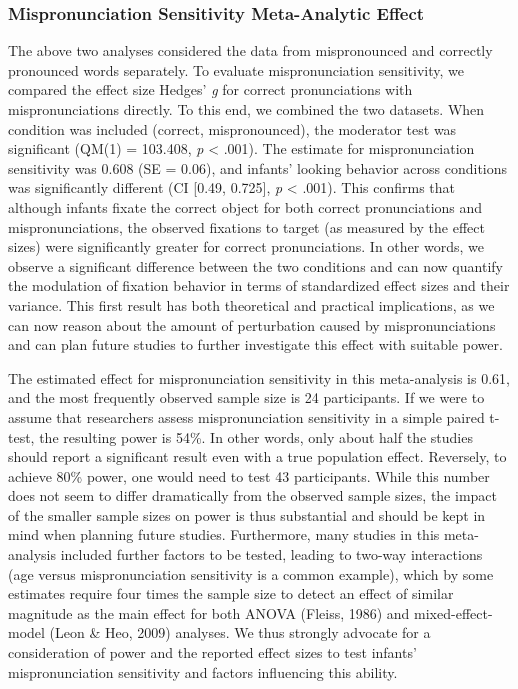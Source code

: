 \documentclass[man]{apa6}
\begin{document}
\hypertarget{mispronunciation-sensitivity-meta-analytic-effect}{%
\subsubsection{Mispronunciation Sensitivity Meta-Analytic Effect}\label{mispronunciation-sensitivity-meta-analytic-effect}}

The above two analyses considered the data from mispronounced and correctly pronounced words separately. To evaluate mispronunciation sensitivity, we compared the effect size Hedges' \emph{g} for correct pronunciations with mispronunciations directly. To this end, we combined the two datasets. When condition was included (correct, mispronounced), the moderator test was significant (QM(1) = 103.408, \emph{p} \textless{} .001). The estimate for mispronunciation sensitivity was 0.608 (SE = 0.06), and infants' looking behavior across conditions was significantly different (CI {[}0.49, 0.725{]}, \emph{p} \textless{} .001). This confirms that although infants fixate the correct object for both correct pronunciations and mispronunciations, the observed fixations to target (as measured by the effect sizes) were significantly greater for correct pronunciations. In other words, we observe a significant difference between the two conditions and can now quantify the modulation of fixation behavior in terms of standardized effect sizes and their variance. This first result has both theoretical and practical implications, as we can now reason about the amount of perturbation caused by mispronunciations and can plan future studies to further investigate this effect with suitable power.

The estimated effect for mispronunciation sensitivity in this meta-analysis is 0.61, and the most frequently observed sample size is 24 participants. If we were to assume that researchers assess mispronunciation sensitivity in a simple paired t-test, the resulting power is 54\%. In other words, only about half the studies should report a significant result even with a true population effect. Reversely, to achieve 80\% power, one would need to test 43 participants. While this number does not seem to differ dramatically from the observed sample sizes, the impact of the smaller sample sizes on power is thus substantial and should be kept in mind when planning future studies. Furthermore, many studies in this meta-analysis included further factors to be tested, leading to two-way interactions (age versus mispronunciation sensitivity is a common example), which by some estimates require four times the sample size to detect an effect of similar magnitude as the main effect for both ANOVA (Fleiss, 1986) and mixed-effect-model (Leon \& Heo, 2009) analyses. We thus strongly advocate for a consideration of power and the reported effect sizes to test infants' mispronunciation sensitivity and factors influencing this ability.
\end{document}
